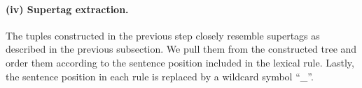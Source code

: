 \documentclass[../../document.tex]{subfiles}
\begin{document}
    \paragraph{(iv) Supertag extraction.}
    The tuples constructed in the previous step closely resemble supertags as described in the previous subsection.
    We pull them from the constructed tree and order them according to the sentence position included in the lexical rule.
    Lastly, the sentence position in each rule is replaced by a wildcard symbol ``\_''.
\end{document}
